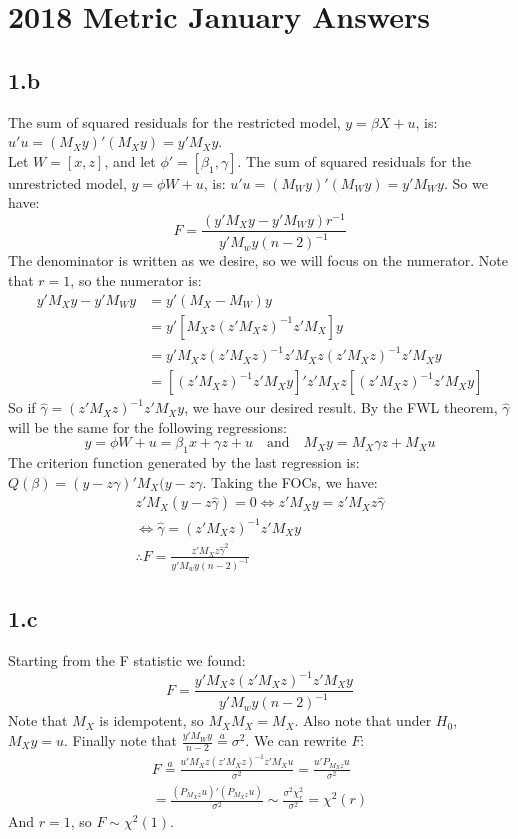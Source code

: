 \section{2018 Metric January Answers}
\subsection{1.b}
The sum of squared residuals for the restricted model, \(y=\beta X+u\), is: \(u'u=(M_Xy)'(M_Xy) = y'M_Xy\).\\
Let \(W=[x,z]\), and let \(\phi'=[\beta_1,\gamma]\).  The sum of squared residuals for the unrestricted model, \(y=\phi W+u\), is: \(u'u=(M_Wy)'(M_Wy) = y'M_Wy\).  So we have:
\[
F = \frac{(y'M_Xy-y'M_Wy)r^{-1}}{y'M_wy(n-2)^{-1}}
\]
The denominator is written as we desire, so we will focus on the numerator.  Note that \(r=1\), so the numerator is:
\begin{align*}
    y'M_Xy-y'M_Wy &= y'(M_X-M_W)y \\
    &= y'[M_Xz(z'M_Xz)^{-1}z'M_X]y \\
    &= y'M_Xz(z'M_Xz)^{-1}z'M_Xz(z'M_Xz)^{-1}z'M_Xy \\
    &= [(z'M_Xz)^{-1}z'M_Xy]'z'M_Xz[(z'M_Xz)^{-1}z'M_Xy]
\end{align*}
So if \(\hat{\gamma}=(z'M_Xz)^{-1}z'M_Xy\), we have our desired result.  By the FWL theorem, \(\hat\gamma\) will be the same for the following regressions: 
\[
y=\phi W+u = \beta_1 x+\gamma z +u \quad \text{and} \quad M_Xy=M_X \gamma z+M_Xu
\]
The criterion function generated by the last regression is: \(Q(\beta)=(y-z\gamma )'M_X(y-z\gamma \).  Taking the FOCs, we have:
\begin{align*}
    z'M_X(y-z\hat{\gamma})=0 \Leftrightarrow z'M_X y=z'M_X z\hat{\gamma}\\
    \Leftrightarrow \hat{\gamma}=(z'M_Xz)^{-1}z'M_Xy \\
    \therefore F=\frac{z'M_Xz\hat{\gamma}^2}{y'M_wy(n-2)^{-1}}
\end{align*}

\subsection{1.c}
Starting from the F statistic we found:
\[
F=\frac{y'M_Xz(z'M_Xz)^{-1}z'M_Xy}{y'M_wy(n-2)^{-1}}
\]
Note that \(M_X\) is idempotent, so \(M_X M_X = M_X\).  Also note that under \(H_0\), \(M_X y =u\).  Finally note that \(\frac{y'M_Wy}{n-2} \overset{a}{=} \sigma^2\).  We can rewrite \(F\):
\begin{align*}
F \overset{a}{=} \frac{u' M_X z (z'M_Xz)^{-1}z'M_X u}{\sigma^2} = \frac{u'P_{M_X z}u}{\sigma^2} \\
= \frac{(P_{M_X z}u)'(P_{M_X z}u)}{\sigma^2} \sim \frac{\sigma^2 \chi^2_r}{\sigma^2} =\chi^2(r)
\end{align*}
And \(r=1\), so \(F\sim \chi^2(1)\).

